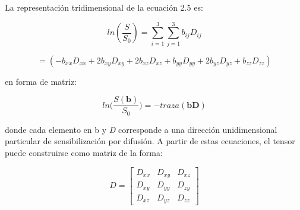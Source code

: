 \documentclass[12pt,a5,twoside]{book}
\begin{document}
La representación tridimensional de la ecuación 2.5 es:

\begin{equation}
ln(\frac{S}{S_0}) = \sum_{i=1}^{3}\sum_{j=1}^{3} b_{ij}D_{ij}
\end{equation}

\begin{equation}
= (-b_{xx}D_{xx}+2b_{xy}D_{xy}+2b_{xz}D_{xz}+b_{yy}D_{yy}+2b_{yz}D_{yz}+b_{zz}D_{zz})
\end{equation}

en forma de matriz:

\begin{equation}
ln \bigg(\frac{S(\textbf{b})}{S_0}\bigg) = -traza(\textbf{bD})
\end{equation}

donde cada elemento en b y {\it D} corresponde a una dirección unidimensional particular de sensibilización por difusión. A partir de estas ecuaciones, el tensor puede construirse como matriz de la forma:

\begin{equation}
D
=
\begin{bmatrix}
    D_{xx} & D_{xy} & D_{xz} \\
    D_{xy} & D_{yy} & D_{zy} \\
    D_{xz} & D_{yz} & D_{zz}
\end{bmatrix}
\end{equation}
\end{document}
